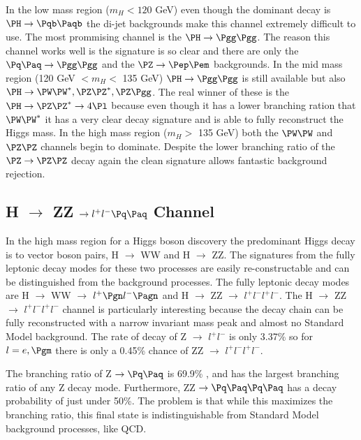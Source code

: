 In the low mass region ($m_H < 120$ GeV) even though the dominant decay is $\PH \rightarrow \Pqb\Paqb$ the di-jet backgrounds make this channel extremely difficult to use.  The most prommising channel is the $\PH \rightarrow \Pgg\Pgg$.  The reason this channel works well is the signature is so clear and there are only the $\Pq\Paq \rightarrow \Pgg\Pgg$ and the $\PZ \rightarrow \Pep\Pem$ backgrounds.  In the mid mass region (120 GeV $< m_H <$ 135 GeV) $\PH \rightarrow \Pgg\Pgg$ is still available but also $\PH \rightarrow \PW\PW^*, \PZ\PZ^*, \PZ\Pgg$. The real winner of these is the $\PH \rightarrow \PZ\PZ^* \rightarrow 4\Pl$ because even though it has a lower branching ration that $\PW\PW^*$ it has a very clear decay signature and is able to fully reconstruct the Higgs mass.  In the high mass region ($m_H >$ 135 GeV) both the $\PW\PW$ and $\PZ\PZ$ channels begin to dominate.  Despite the lower branching ratio of the  $\PZ \rightarrow \PZ\PZ$ decay again the clean signature allows fantastic background rejection.


\subsection{H $\rightarrow$ ZZ $\rightarrow l^{+}l^{-} \Pq \Paq$ Channel}
In the high mass region for a Higgs boson discovery the predominant Higgs decay is to vector boson pairs, H $\rightarrow$ WW and H $\rightarrow$ ZZ.  The signatures from the fully leptonic decay modes for these two processes are easily re-constructable and can be distinguished from the background processes.  The fully leptonic decay modes are H $\rightarrow$ WW $\rightarrow$ $l^{+} \Pgn l^{-} \Pagn$ and H $\rightarrow$ ZZ $\rightarrow$ $l^{+}l^{-}l^{+}l^{-}$. The H $\rightarrow$ ZZ $\rightarrow$ $l^{+}l^{-}l^{+}l^{-}$ channel is particularly interesting because the decay chain can be fully reconstructed with a narrow invariant mass peak and almost no Standard Model background. The rate of decay of Z $\rightarrow$ $l^{+}l^{-}$ is only 3.37\% \cite{PDG2012} so for $ l = e,\Pgm$ there is only a 0.45\% chance of ZZ $\rightarrow$ $l^{+}l^{-}l^{+}l^{-}$.

The branching ratio of Z $\rightarrow \Pq \Paq$ is 69.9\% \cite{PDG2012}, and has the largest branching ratio of any Z decay mode. Furthermore, ZZ $\rightarrow \Pq \Paq \Pq \Paq$ has a decay probability of just under 50\%. The problem is that while this maximizes the branching ratio, this final state is indistinguishable from Standard Model background processes, like QCD.

